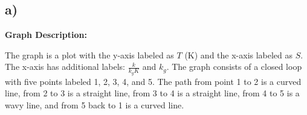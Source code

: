 

\subsection*{a)}

\begin{center}
\textbf{Graph Description:}

The graph is a plot with the y-axis labeled as \( T \) (K) and the x-axis labeled as \( S \). The x-axis has additional labels: \( \frac{k}{k_g K} \) and \( k_g \). The graph consists of a closed loop with five points labeled 1, 2, 3, 4, and 5. The path from point 1 to 2 is a curved line, from 2 to 3 is a straight line, from 3 to 4 is a straight line, from 4 to 5 is a wavy line, and from 5 back to 1 is a curved line.
\end{center}